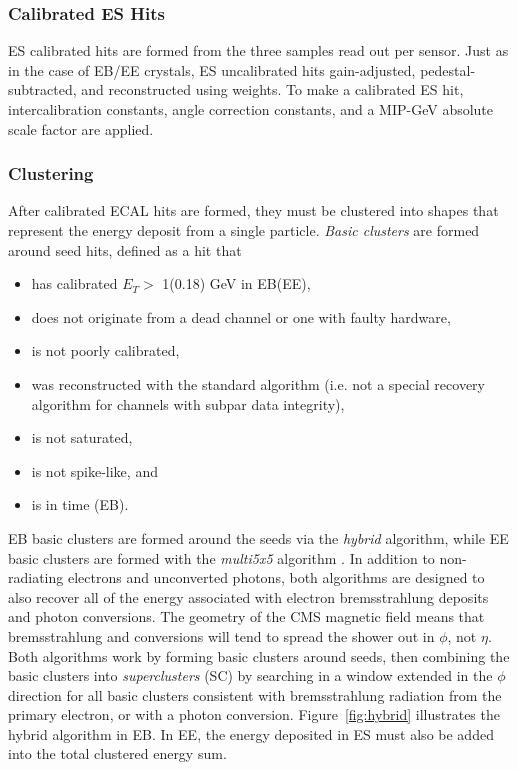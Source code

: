 \documentclass[dissertation.tex]{subfiles}
\begin{document}
\subsubsection{Calibrated ES Hits}
\label{sec:Calibrated ES Hits}

ES calibrated hits are formed from the three samples read out per sensor.  Just as in the case of EB/EE crystals, ES uncalibrated hits gain-adjusted, pedestal-subtracted, and reconstructed using weights.  To make a calibrated ES hit, intercalibration constants, angle correction constants, and a MIP-GeV absolute scale factor are applied.

\subsubsection{Clustering}

After calibrated ECAL hits are formed, they must be clustered into shapes that represent the energy deposit from a single particle.  \textit{Basic clusters} are formed around seed hits, defined as a hit that

\begin{itemize}
\item has calibrated $E_{T} >$ 1(0.18) GeV in EB(EE),
\item does not originate from a dead channel or one with faulty hardware,
\item is not poorly calibrated,
\item was reconstructed with the standard algorithm (i.e. not a special recovery algorithm for channels with subpar data integrity),
\item is not saturated,
\item is not spike-like, and
\item is in time (EB).
\end{itemize}
%
EB basic clusters are formed around the seeds via the \textit{hybrid} algorithm, while EE basic clusters are formed with the \textit{multi5x5} algorithm \cite{ECAL_SC_note}.  In addition to non-radiating electrons and unconverted photons, both algorithms are designed to also recover all of the energy associated with electron bremsstrahlung deposits and photon conversions.  The geometry of the CMS magnetic field means that bremsstrahlung and conversions will tend to spread the shower out in $\phi$, not $\eta$.  Both algorithms work by forming basic clusters around seeds, then combining the basic clusters into \textit{superclusters} (SC) by searching in a window extended in the $\phi$ direction for all basic clusters consistent with bremsstrahlung radiation from the primary electron, or with a photon conversion.  Figure~\ref{fig:hybrid} illustrates the hybrid algorithm in EB.  In EE, the energy deposited in ES must also be added into the total clustered energy sum.
\end{document}
